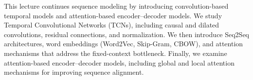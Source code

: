 \documentclass{article}
\begin{document}
This lecture continues sequence modeling by introducing convolution-based temporal models and attention-based encoder–decoder models. We study Temporal Convolutional Networks (TCNs), including causal and dilated convolutions, residual connections, and normalization. We then introduce Seq2Seq architectures, word embeddings (Word2Vec, Skip-Gram, CBOW), and attention mechanisms that address the fixed-context bottleneck. Finally, we examine attention-based encoder–decoder models, including global and local attention mechanisms for improving sequence alignment.


\end{document}
